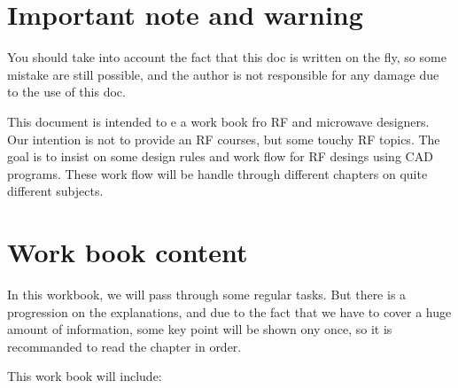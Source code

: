 %
%
%
%


\section*{Important note and warning}

You should take into account the fact that this doc is written on the fly, so some mistake are still possible, and the author is not responsible for any damage due to the use of this doc.

\bigskip

This document is intended to e a work book fro RF and microwave designers. Our intention is not to provide an RF courses, but some touchy RF topics. The goal is to insist on some design rules and work flow for RF desings using CAD programs. These work flow will be handle through different chapters on quite different subjects.

\section*{Work book content}

In this workbook, we will pass through some regular tasks. But there is a progression on the explanations, and due to the fact that we have to cover a huge amount of information, some key point will be shown ony once, so it is recommanded to read the chapter in order. 

\bigskip

This work book will include:

